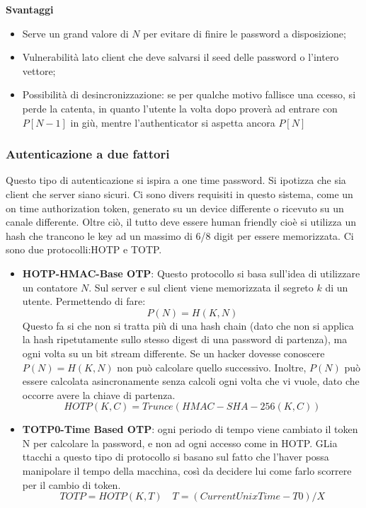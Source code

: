 \documentclass{article}
\theoremstyle{remark}
\begin{document}
\textbf{Svantaggi}
\begin{itemize}
    \item Serve un grand valore di $N$ per evitare di finire le password a disposizione;
    \item Vulnerabilità lato client che deve salvarsi il seed delle password o l'intero vettore;
    \item Possibilità di desincronizzazione: se per qualche motivo fallisce una ccesso, si perde la catenta, in quanto l'utente la volta dopo proverà ad entrare con $P[N-1]$ in giù, mentre l'authenticator si aspetta ancora $P[N]$
\end{itemize}
\subsubsection{Autenticazione a due fattori}
Questo tipo di autenticazione si ispira a one time password. Si ipotizza che sia client che server siano sicuri. Ci sono divers requisiti in questo sistema, come un on time authorization token, generato su un device differente o ricevuto su un canale differente. Oltre ciò, il tutto deve essere human friendly cioè si utilizza un hash che trancono le key ad un massimo di 6/8 digit per essere memorizzata.\newline
Ci sono due protocolli:HOTP e TOTP.\begin{itemize}
    \item \textbf{HOTP-HMAC-Base OTP}: Questo protocollo si basa sull'idea di utilizzare un contatore $N$. Sul server e sul client viene memorizzata il segreto $k$ di un utente. Permettendo di fare:\begin{equation*}
        P(N)=H(K,N)
    \end{equation*}
    Questo fa si che non si tratta più di una hash chain (dato che non si applica la hash ripetutamente sullo stesso digest di una password di partenza), ma ogni volta su un bit stream differente. Se un hacker dovesse conoscere $P(N)=H(K,N)$ non può calcolare quello successivo. Inoltre, $P(N)$ può essere calcolata asincronamente senza calcoli ogni volta che vi vuole, dato che occorre avere la chiave di partenza.
    \begin{equation*}
        HOTP(K,C)=Trunce(HMAC-SHA-256(K,C))
    \end{equation*}
    \item \textbf{TOTP0-Time Based OTP}: ogni periodo di tempo viene cambiato il token N per calcolare la password, e non ad ogni accesso come in HOTP. GLia ttacchi a questo tipo di protocollo si basano sul fatto che l'haver possa manipolare il tempo della macchina, così da decidere lui come farlo scorrere per il cambio di token.
    \begin{equation*}
        TOTP=HOTP(K,T)\quad T=(Current Unix Time-T0)/X
    \end{equation*}
\end{itemize}
\end{document}
